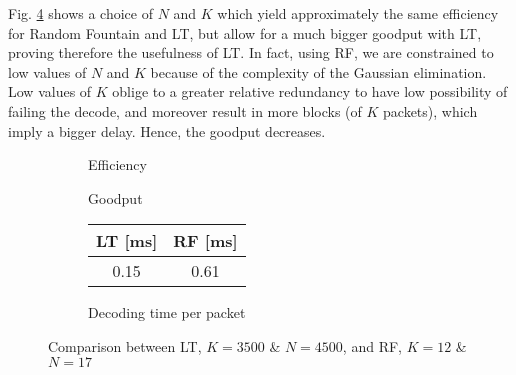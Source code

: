 Fig. \ref{fig:RFLT} shows a choice of $N$ and $K$ which yield approximately the same efficiency for Random Fountain and LT, but allow for a much bigger goodput with LT, proving therefore the usefulness of LT. In fact, using RF, we are constrained to low values of $N$ and $K$ because of the complexity of the Gaussian elimination. Low values of $K$ oblige to a greater relative redundancy to have low possibility of failing the decode, and moreover result in more blocks (of $K$ packets), which imply a bigger delay. Hence, the goodput decreases.
\begin{figure}[!h]
\centering
\begin{subfigure}{0.23\textwidth}
	\captionsetup{justification=centering,font=scriptsize}
	\centering
	\setlength\fwidth{\textwidth}
	\setlength{}
	
	\caption{Efficiency}
	\label{fig:RF_eff}
\end{subfigure}\hspace{2em}%
\begin{subfigure}{0.23\textwidth}
	\captionsetup{justification=centering,font=scriptsize}
	\centering
	\setlength\fwidth{\textwidth}
	\setlength{}
	
	\caption{Goodput}
	\label{fig:RF_good}
\end{subfigure}\hspace{2em}%
\begin{subfigure}{0.23\textwidth}
	\captionsetup{justification=centering,font=scriptsize}
	\small
	\centering
	\begin{tabular}[c]{c|c}
		LT [ms] & RF [ms] \\ \hline
		0.15 & 0.61 \\
	\end{tabular}
	\caption{Decoding time per packet}
	\label{fig:RFLT_dectime}
\end{subfigure}
\caption{Comparison between LT, $K=3500$ \& $N=4500$, and RF, $K=12$ \& $N=17$}
\label{fig:RFLT}
\end{figure}